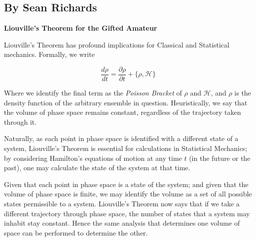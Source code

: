 \subsection{By Sean Richards}
{\bf Liouville's Theorem for the Gifted Amateur}

Liouville's Theorem has profound implications for Classical and 
Statistical mechanics. Formally, we write

$$\frac{d\rho}{dt}=\frac{\partial\rho}{\partial t}+\{\rho, 
\mathcal{H}\}$$

Where we identify the final term as the \textit{Poisson Bracket} of 
$\rho$ and $\mathcal{H}$, and $\rho$ is the density function of the 
arbitrary ensemble in question. Heuristically, we say that the volume of 
phase space remains constant, regardless of the trajectory taken through 
it.

Naturally, as each point in phase space is identified with a different 
state of a system, Liouville's Theorem is essential for calculations in 
Statistical Mechanics; by considering Hamilton's equations of motion at 
any time $t$ (in the future or the past), one may calculate the state of 
the system at that time.

Given that each point in phase space is a state of the system; and given 
that the volume of phase space is finite, we may identify the volume as 
a set of all possible states permissible to a system. Liouville's 
Theorem now says that if we take a different trajectory through phase 
space, the number of states that a system may inhabit stay constant. 
Hence the same analysis that determines one volume of space can be 
performed to determine the other.
